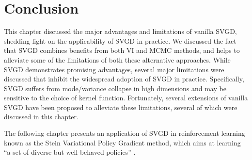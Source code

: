 

\section{Conclusion}

This chapter discussed the major advantages and limitations of vanilla SVGD, shedding light on the applicability of SVGD in practice. We discussed the fact that SVGD combines benefits from both VI and MCMC methods, and helps to alleviate some of the limitations of both these alternative approaches. While SVGD demonstrates promising advantages, several major limitations were discussed that inhibit the widespread adoption of SVGD in practice. Specifically, SVGD suffers from mode/variance collapse in high dimensions and may be sensitive to the choice of kernel function. Fortunately, several extensions of vanilla SVGD have been proposed to alleviate these limitations, several of which were discussed in this chapter.


The following chapter presents an application of SVGD in reinforcement learning known as the Stein Variational Policy Gradient method, which aims at learning ``a set of diverse but well-behaved policies'' \citep{liu_svpg}.



